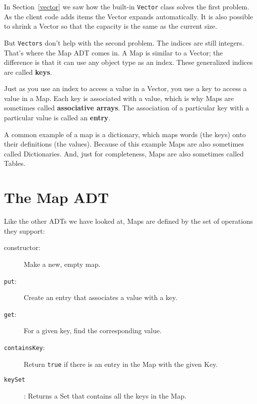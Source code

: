 In Section~\ref{vector} we saw how the built-in {\tt Vector} class
solves the first problem.  As the client code adds items the Vector
expands automatically.  It is also possible to shrink a Vector so that
the capacity is the same as the current size.

But {\tt Vectors} don't help with the second problem.  The indices are
still integers.  That's where the Map ADT comes in.  A Map is similar
to a Vector; the difference is that it can use any object type as an
index.  These generalized indices are called {\bf keys}.

Just as you use an index to access a value in a Vector, you use a key
to access a value in a Map.  Each key is associated with a value,
which is why Maps are sometimes called {\bf associative arrays}.  The
association of a particular key with a particular value is called an
{\bf entry}.


A common example of a map is a dictionary, which maps
words (the keys) onto their definitions (the
values).  Because of this example Maps are also sometimes called
Dictionaries.  And, just for completeness, Maps are also sometimes
called Tables.


\section {The Map ADT}
\label{map}

Like the other ADTs we have looked at, Maps are defined
by the set of operations they support:

\begin{description}

\item[constructor:] Make a new, empty map. 

\item[{\tt put}:]  Create an entry that associates a value with a key.

\item[{\tt get}:]  For a given key, find the corresponding value.

\item[{\tt containsKey}:]  Return {\tt true} if there
is an entry in the Map with the given Key.

\item[{\tt keySet}]: Returns a Set that contains all the keys
in the Map.

\end{description}


